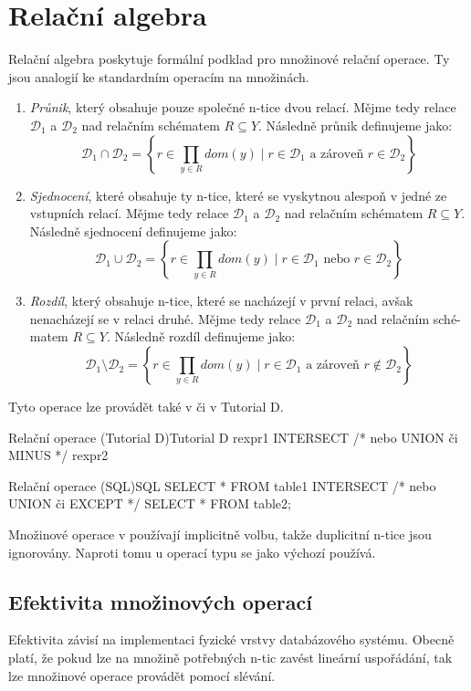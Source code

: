 \section{Relační algebra}
Relační algebra poskytuje formální podklad pro množinové relační operace. Ty jsou analogií ke standardním operacím na množinách.
\begin{enumerate}
\item \textit{Průnik}, který obsahuje pouze společné n-tice dvou relací. Mějme tedy relace $\mathcal{D}_{1}$ a $\mathcal{D}_{2}$ nad relačním schématem $R \subseteq Y$. Následně průnik definujeme jako:
$$
\mathcal{D}_{1} \cap \mathcal{D}_{2} = \left\{ r \in \prod_{y \in R} dom(y) \; | \; r \in \mathcal{D}_{1} \text{ a zároveň } r \in \mathcal{D}_{2} \right\}
$$
\item \textit{Sjednocení}, které obsahuje ty n-tice, které se vyskytnou alespoň v jedné ze vstupních relací. Mějme tedy relace $\mathcal{D}_{1}$ a $\mathcal{D}_{2}$ nad relačním schématem $R \subseteq Y$. Následně sjednocení definujeme jako:
$$
\mathcal{D}_{1} \cup \mathcal{D}_{2} = \left\{ r \in \prod_{y \in R} dom(y) \; | \; r \in \mathcal{D}_{1} \text{ nebo } r \in \mathcal{D}_{2} \right\}
$$
\item \textit{Rozdíl}, který obsahuje n-tice, které se nacházejí v první relaci, avšak nenacházejí se v relaci druhé. Mějme tedy relace $\mathcal{D}_{1}$ a $\mathcal{D}_{2}$ nad relačním sché-matem $R \subseteq Y$. Následně rozdíl definujeme jako:
$$
\mathcal{D}_{1} \setminus \mathcal{D}_{2} = \left\{ r \in \prod_{y \in R} dom(y) \; | \; r \in \mathcal{D}_{1} \text{ a zároveň } r \notin \mathcal{D}_{2} \right\}
$$
\end{enumerate}
Tyto operace lze provádět také v  či v Tutorial D.
\begin{upcode}{Relační operace (Tutorial D)}{}{Tutorial D}
rexpr1 INTERSECT /* nebo UNION či MINUS */ rexpr2
\end{upcode}
\begin{upcode}{Relační operace (SQL)}{}{SQL}
SELECT * FROM table1
	INTERSECT /* nebo UNION či EXCEPT */
SELECT * FROM table2;
\end{upcode}
Množinové operace v  používají implicitně volbu, takže duplicitní n-tice jsou ignorovány. Naproti tomu u operací typu se jako výchozí používá.

\subsection{Efektivita množinových operací}
Efektivita závisí na implementaci fyzické vrstvy databázového systému. Obecně platí, že pokud lze na množině potřebných n-tic zavést lineární uspořádání, tak lze množinové operace provádět pomocí slévání.

